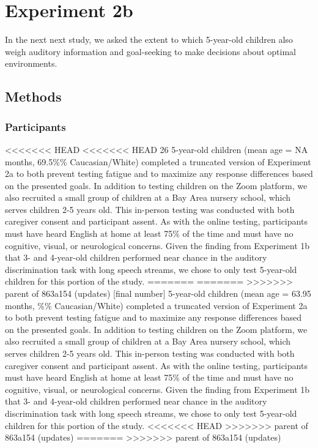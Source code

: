 \documentclass[10pt, letterpaper]{article}
\begin{document}
\hypertarget{experiment-2b}{%
\section{Experiment 2b}\label{experiment-2b}}

In the next next study, we asked the extent to which 5-year-old children
also weigh auditory information and goal-seeking to make decisions about
optimal environments.

\hypertarget{methods-3}{%
\subsection{Methods}\label{methods-3}}

\hypertarget{participants-3}{%
\subsubsection{Participants}\label{participants-3}}

<<<<<<< HEAD
<<<<<<< HEAD
26 5-year-old children (mean age = NA months, 69.5\%\% Caucasian/White)
completed a truncated version of Experiment 2a to both prevent testing
fatigue and to maximize any response differences based on the presented
goals. In addition to testing children on the Zoom platform, we also
recruited a small group of children at a Bay Area nursery school, which
serves children 2-5 years old. This in-person testing was conducted with
both caregiver consent and participant assent. As with the online
testing, participants must have heard English at home at least 75\% of
the time and must have no cognitive, visual, or neurological concerns.
Given the finding from Experiment 1b that 3- and 4-year-old children
performed near chance in the auditory discrimination task with long
speech streams, we chose to only test 5-year-old children for this
portion of the study.
=======
=======
>>>>>>> parent of 863a154 (updates)
{[}final number{]} 5-year-old children (mean age = 63.95 months, \%\%
Caucasian/White) completed a truncated version of Experiment 2a to both
prevent testing fatigue and to maximize any response differences based
on the presented goals. In addition to testing children on the Zoom
platform, we also recruited a small group of children at a Bay Area
nursery school, which serves children 2-5 years old. This in-person
testing was conducted with both caregiver consent and participant
assent. As with the online testing, participants must have heard English
at home at least 75\% of the time and must have no cognitive, visual, or
neurological concerns. Given the finding from Experiment 1b that 3- and
4-year-old children performed near chance in the auditory discrimination
task with long speech streams, we chose to only test 5-year-old children
for this portion of the study.
<<<<<<< HEAD
>>>>>>> parent of 863a154 (updates)
=======
>>>>>>> parent of 863a154 (updates)
\end{document}
